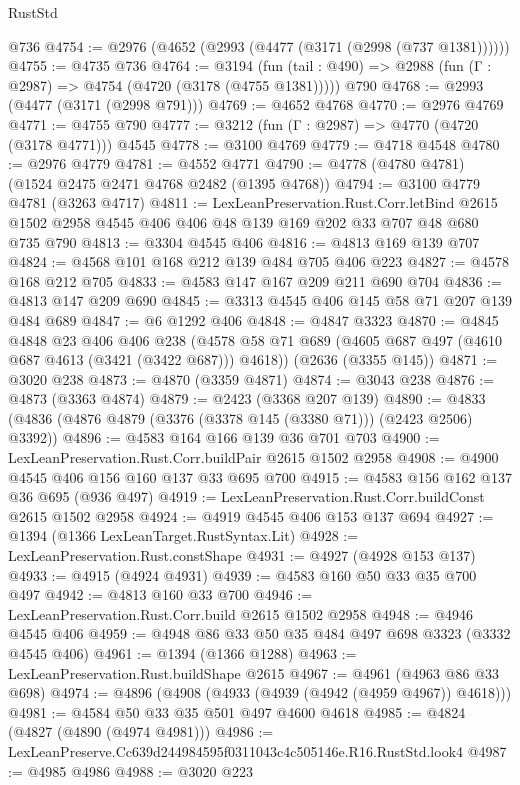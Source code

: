 \begin{lexlean}{RustStd}
\begin{coremodule}
    @736
@4754 := @2976 (@4652 (@2993 (@4477 (@3171 (@2998 (@737 @1381))))))
@4755 := @4735 @736
@4764 := @3194
    (fun (tail : @490) => @2988 (fun (Γ : @2987) => @4754 (@4720 (@3178 (@4755 @1381)))))
    @790
@4768 := @2993 (@4477 (@3171 (@2998 @791)))
@4769 := @4652 @4768
@4770 := @2976 @4769
@4771 := @4755 @790
@4777 := @3212 (fun (Γ : @2987) => @4770 (@4720 (@3178 @4771))) @4545
@4778 := @3100 @4769
@4779 := @4718 @4548
@4780 := @2976 @4779
@4781 := @4552 @4771
@4790 := @4778 (@4780 @4781) (@1524 @2475 @2471 @4768 @2482 (@1395 @4768))
@4794 := @3100 @4779 @4781 (@3263 @4717)
@4811 := LexLeanPreservation.Rust.Corr.letBind
    @2615
    @1502
    @2958
    @4545
    @406
    @406
    @48
    @139
    @169
    @202
    @33
    @707
    @48
    @680
    @735
    @790
@4813 := @3304 @4545 @406
@4816 := @4813 @169 @139 @707
@4824 := @4568 @101 @168 @212 @139 @484 @705 @406 @223
@4827 := @4578 @168 @212 @705
@4833 := @4583 @147 @167 @209 @211 @690 @704
@4836 := @4813 @147 @209 @690
@4845 := @3313 @4545 @406 @145 @58 @71 @207 @139 @484 @689
@4847 := @6 @1292 @406
@4848 := @4847 @3323
@4870 := @4845
    @4848
    @23
    @406
    @406
    @238
    (@4578 @58 @71 @689 (@4605 @687 @497 (@4610 @687 @4613 (@3421 (@3422 @687))) @4618))
    (@2636 (@3355 @145))
@4871 := @3020 @238
@4873 := @4870 (@3359 @4871)
@4874 := @3043 @238
@4876 := @4873 (@3363 @4874)
@4879 := @2423 (@3368 @207 @139)
@4890 := @4833 (@4836 (@4876 @4879 (@3376 (@3378 @145 (@3380 @71))) (@2423 @2506) @3392))
@4896 := @4583 @164 @166 @139 @36 @701 @703
@4900 := LexLeanPreservation.Rust.Corr.buildPair @2615 @1502 @2958
@4908 := @4900 @4545 @406 @156 @160 @137 @33 @695 @700
@4915 := @4583 @156 @162 @137 @36 @695 (@936 @497)
@4919 := LexLeanPreservation.Rust.Corr.buildConst @2615 @1502 @2958
@4924 := @4919 @4545 @406 @153 @137 @694
@4927 := @1394 (@1366 LexLeanTarget.RustSyntax.Lit)
@4928 := LexLeanPreservation.Rust.constShape
@4931 := @4927 (@4928 @153 @137)
@4933 := @4915 (@4924 @4931)
@4939 := @4583 @160 @50 @33 @35 @700 @497
@4942 := @4813 @160 @33 @700
@4946 := LexLeanPreservation.Rust.Corr.build @2615 @1502 @2958
@4948 := @4946 @4545 @406
@4959 := @4948 @86 @33 @50 @35 @484 @497 @698 @3323 (@3332 @4545 @406)
@4961 := @1394 (@1366 @1288)
@4963 := LexLeanPreservation.Rust.buildShape @2615
@4967 := @4961 (@4963 @86 @33 @698)
@4974 := @4896 (@4908 (@4933 (@4939 (@4942 (@4959 @4967)) @4618)))
@4981 := @4584 @50 @33 @35 @501 @497 @4600 @4618
@4985 := @4824 (@4827 (@4890 (@4974 @4981)))
@4986 := LexLeanPreserve.Cc639d244984595f0311043c4c505146e.R16.RustStd.look4
@4987 := @4985 @4986
@4988 := @3020 @223

\end{coremodule}
\end{lexlean}
